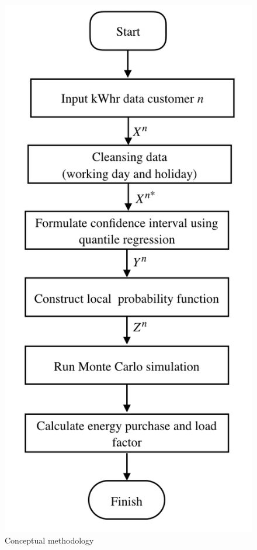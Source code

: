 \documentclass[conference]{IEEEtran}
\begin{document}
\begin{figure}[htbp]
  \centerline{\includegraphics{images/overall_methodology.png}}
  \caption{Conceptual methodology}
  \label{fig.overall_methodology}
\end{figure}
\end{document}
